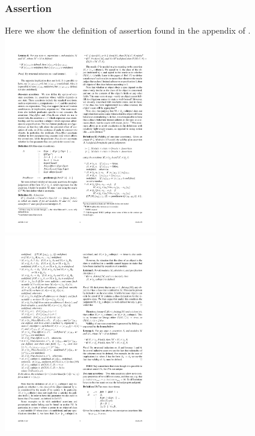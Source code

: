 \documentclass[a4paper,11pt,twoside]{article}
\begin{document}
{\subsubsection{Assertion}\label{app:assertion}
Here we show the definition of assertion found in the appendix of \cite{drossopoulou2015b}.\\
\includegraphics[width=0.5\textwidth,valign=t]{figures/app_assertion1.pdf}
\includegraphics[width=0.5\textwidth,valign=t]{figures/app_assertion2.pdf}
\clearpage
}
\end{document}
